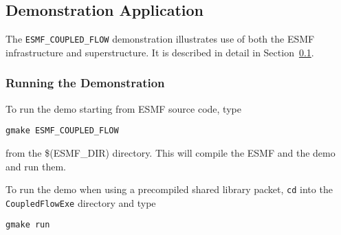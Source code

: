 \subsection{Demonstration Application}
\label{sec:demo}

The {\tt ESMF\_COUPLED\_FLOW} demonstration illustrates use of both the
ESMF infrastructure and superstructure.  It is described in detail in 
Section~\ref{sec:demo}.

\subsubsection{Running the Demonstration}

To run the demo starting from ESMF source code, type 

\begin{verbatim}
gmake ESMF_COUPLED_FLOW
\end{verbatim}

from the \$(ESMF\_DIR) directory.  This will compile the 
ESMF and the demo and run them.

To run the demo when using a precompiled shared
library packet, {\tt cd} into the {\tt CoupledFlowExe}
directory and type

\begin{verbatim}
gmake run
\end{verbatim}






























